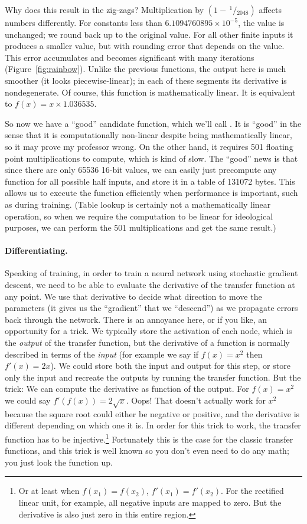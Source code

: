 \documentclass[twocolumn]{article}
\newcommand\sfrac[2]{\!{}\,^{#1}\!/{}\!_{#2}}
\begin{document}
Why does this result in the zig-zags? Multiplication by $(1 -
\sfrac{1}{2048})$ affects numbers differently. For constants less than
$6.1094760895 \times 10^{-5}$, the value is unchanged; we round back up to
the original value. For all other finite inputs it produces a smaller
value, but with rounding error that depends on the value. This error
accumulates and becomes significant with many iterations
(Figure~\ref{fig:rainbow}). Unlike the previous functions, the output
here is much smoother (it looks piecewise-linear); in each of these
segments its derivative is nondegenerate. Of course, this function is
mathematically linear. It is equivalent to $f(x) = x \times 1.036535$.

So now we have a ``good'' candidate function, which we'll call \gradone.
It is ``good'' in the sense that it is computationally non-linear
despite being mathematically linear, so it may prove my professor
wrong. On the other hand, it requires 501 floating point
multiplications to compute, which is kind of slow. The ``good'' news
is that since there are only 65536 16-bit values, we can easily just
precompute any function for all possible half inputs, and store it in
a table of 131072 bytes. This allows us to execute the function
efficiently when performance is important, such as during training.
(Table lookup is certainly not a mathematically linear operation, so
when we require the computation to be linear for ideological purposes,
we can perform the 501 multiplications and get the same result.)

\paragraph{Differentiating.}
Speaking of training, in order to train a neural network using
stochastic gradient descent, we need to be able to evaluate the
derivative of the transfer function at any point. We use that
derivative to decide what direction to move the parameters (it gives
us the ``gradient'' that we ``descend'') as we propagate errors back
through the network. There is an annoyance here, or if you like, an
opportunity for a trick. We typically store the activation of each
node, which is the {\em output} of the transfer function, but the
derivative of a function is normally described in terms of the {\em
  input} (for example we say if $f(x) = x^2$ then $f'(x) = 2x$). We
could store both the input and output for this step, or store only the
input and recreate the outputs by running the transfer function. But
the trick: We can compute the derivative as function of the output.
For $f(x) = x^2$ we could say $f'(f(x)) = 2\sqrt{x}$. Oops! That
doesn't actually work for $x^2$ because the square root could
either be negative or positive, and the derivative is different
depending on which one it is. In order for this trick to work,
the transfer function has to be injective.\footnote{Or at least
  when $f(x_1) = f(x_2)$, $f'(x_1) = f'(x_2)$. For the rectified
  linear unit, for example, all negative inputs are mapped to zero.
  But the derivative is also just zero in this entire region.}
Fortunately this is the case for the classic transfer functions,
and this trick is well known so you don't even need to do any math;
you just look the function up.
\end{document}
